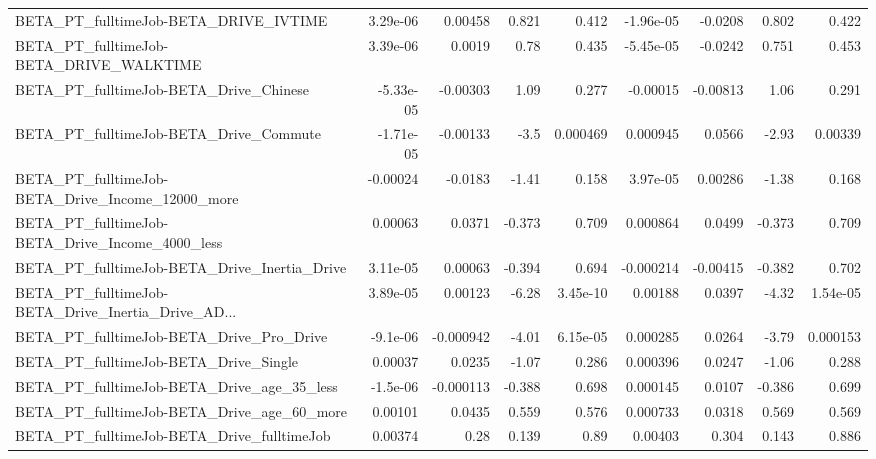 \begin{tabular}{lrrrrrrrr}
BETA\_PT\_fulltimeJob-BETA\_DRIVE\_IVTIME              &    3.29e-06 &      0.00458 &    0.821 &    0.412 &  -1.96e-05 &     -0.0208 &        0.802 &         0.422 \\
BETA\_PT\_fulltimeJob-BETA\_DRIVE\_WALKTIME            &    3.39e-06 &       0.0019 &     0.78 &    0.435 &  -5.45e-05 &     -0.0242 &        0.751 &         0.453 \\
BETA\_PT\_fulltimeJob-BETA\_Drive\_Chinese             &   -5.33e-05 &     -0.00303 &     1.09 &    0.277 &   -0.00015 &    -0.00813 &         1.06 &         0.291 \\
BETA\_PT\_fulltimeJob-BETA\_Drive\_Commute             &   -1.71e-05 &     -0.00133 &     -3.5 & 0.000469 &   0.000945 &      0.0566 &        -2.93 &       0.00339 \\
BETA\_PT\_fulltimeJob-BETA\_Drive\_Income\_12000\_more   &    -0.00024 &      -0.0183 &    -1.41 &    0.158 &   3.97e-05 &     0.00286 &        -1.38 &         0.168 \\
BETA\_PT\_fulltimeJob-BETA\_Drive\_Income\_4000\_less    &     0.00063 &       0.0371 &   -0.373 &    0.709 &   0.000864 &      0.0499 &       -0.373 &         0.709 \\
BETA\_PT\_fulltimeJob-BETA\_Drive\_Inertia\_Drive       &    3.11e-05 &      0.00063 &   -0.394 &    0.694 &  -0.000214 &    -0.00415 &       -0.382 &         0.702 \\
BETA\_PT\_fulltimeJob-BETA\_Drive\_Inertia\_Drive\_AD... &    3.89e-05 &      0.00123 &    -6.28 & 3.45e-10 &    0.00188 &      0.0397 &        -4.32 &      1.54e-05 \\
BETA\_PT\_fulltimeJob-BETA\_Drive\_Pro\_Drive           &    -9.1e-06 &    -0.000942 &    -4.01 & 6.15e-05 &   0.000285 &      0.0264 &        -3.79 &      0.000153 \\
BETA\_PT\_fulltimeJob-BETA\_Drive\_Single              &     0.00037 &       0.0235 &    -1.07 &    0.286 &   0.000396 &      0.0247 &        -1.06 &         0.288 \\
BETA\_PT\_fulltimeJob-BETA\_Drive\_age\_35\_less         &    -1.5e-06 &    -0.000113 &   -0.388 &    0.698 &   0.000145 &      0.0107 &       -0.386 &         0.699 \\
BETA\_PT\_fulltimeJob-BETA\_Drive\_age\_60\_more         &     0.00101 &       0.0435 &    0.559 &    0.576 &   0.000733 &      0.0318 &        0.569 &         0.569 \\
BETA\_PT\_fulltimeJob-BETA\_Drive\_fulltimeJob         &     0.00374 &         0.28 &    0.139 &     0.89 &    0.00403 &       0.304 &        0.143 &         0.886 \\

\end{tabular}
